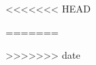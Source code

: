 \documentclass[12pt,hyperref,a4paper,UTF8]{ctexbook}
\begin{document}
\pagestyle{empty} %
\covercontent %

\cleardoublepage %
\pagestyle{plain} %
\tableofcontents %
\cleardoublepage %

\pagestyle{customstyle} %




%   

<<<<<<< HEAD
  
=======
  
>>>>>>> date
 
\end{document}
